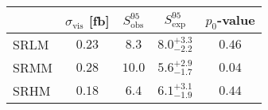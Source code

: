 \begin{table}[!ht]
    \begin{center}\renewcommand\arraystretch{1.3}
    \begin{tabular*}{\textwidth}{@{\extracolsep{\fill}}lcccc}
    \noalign{\smallskip}\hline\noalign{\smallskip}
    \textbf{}       & $\sigma^{}_\textrm{vis}$ [fb] & $S^{95}_\mathrm{obs}$ & $S^{95}_\mathrm{exp}$ & $p_0$-value \\ \hline 
    
    
    SRLM       & $0.23$ & $8.3$  &  $8.0^{ +3.3 }_{ -2.2 }$     & $0.46$ \\ 
    SRMM   & $0.28$ & $10.0$ & $ { 5.6 }^{ +2.9 }_{ -1.7 }$ %
                                                                     & $0.04$ \\ 
    SRHM      & $0.18$ & $6.4$  &  $6.1^{ +3.1 }_{ -1.9 }$     & $0.44$ \\ \hline 
    
    
    
    
    
    \hline
    

\end{tabular*}
\end{center}
\end{table}
